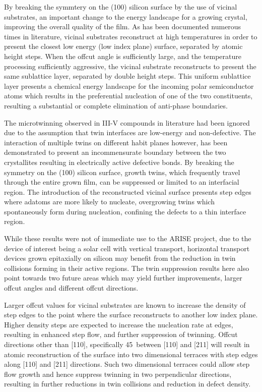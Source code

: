 By breaking the symmtery on the (100) silicon surface by the use of vicinal substrates, an important change to the energy landscape for a growing crystal, improving the overall quality of the film.
As has been documented numerous times in literature, vicinal substrates reconstruct at high temperatures in order to present the closest low energy (low index plane) surface, separated by atomic height steps.
When the offcut angle is sufficiently large, and the temperature processing sufficiently aggressive, the vicinal substrate reconstructs to present the same sublattice layer, separated by double height steps.
This uniform sublattice layer presents a chemical energy landscape for the incoming polar semiconductor atoms which results in the preferential nucleation of one of the two constituents, resulting a substantial or complete elimination of anti-phase boundaries.

The microtwinning observed in III-V compounds in literature had been ignored due to the assumption that twin interfaces are low-energy and non-defective.
The interaction of multiple twins on different habit planes however, has been demonstrated to present an incommensurate boundary between the two crystallites resulting in electrically active defective bonds.
By breaking the symmetry on the (100) silicon surface, growth twins, which frequently travel through the entire grown film, can be suppressed or limited to an interfacial region.
The introduction of the reconstructed vicinal surface presents step edges where adatoms are more likely to nucleate, overgrowing twins which spontaneously form during nucleation, confining the defects to a thin interface region.

While these results were not of immediate use to the ARISE project, due to the device of interest being a solar cell with vertical transport, horizontal transport devices grown epitaxially on silicon may benefit from the reduction in twin collisions forming in their active regions.
The twin suppression results here also point towards two future areas which may yield further improvements, larger offcut angles and different offcut directions.

Larger offcut values for vicinal substrates are known to increase the density of step edges to the point where the surface reconstructs to another low index plane.
Higher density steps are expected to increase the nucleation rate at edges, resulting in enhanced step flow, and further suppression of twinning.
Offcut directions other than [110], specifically 45\degree~between [110] and [211] will result in atomic reconstruction of the surface into two dimensional terraces with step edges along [110] and [211] directions.
Such two dimensional terraces could allow step flow growth and hence suppress twinning in two perpendicular directions, resulting in further reductions in twin collisions and reduction in defect density.
